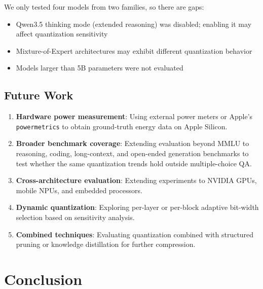 \documentclass[11pt,a4paper]{article}
\begin{document}
We only tested four models from two families, so there are gaps:

\begin{itemize}[leftmargin=*,nosep]
    \item Qwen3.5 thinking mode (extended reasoning) was disabled; enabling it may affect quantization sensitivity
    \item Mixture-of-Expert architectures may exhibit different quantization behavior
    \item Models larger than 5B parameters were not evaluated
\end{itemize}

\subsection{Future Work}

\begin{enumerate}[leftmargin=*,nosep]
    \item \textbf{Hardware power measurement}: Using external power meters or Apple's \texttt{powermetrics} to obtain ground-truth energy data on Apple Silicon.

    \item \textbf{Broader benchmark coverage}: Extending evaluation beyond MMLU to reasoning, coding, long-context, and open-ended generation benchmarks to test whether the same quantization trends hold outside multiple-choice QA.

    \item \textbf{Cross-architecture evaluation}: Extending experiments to NVIDIA GPUs, mobile NPUs, and embedded processors.

    \item \textbf{Dynamic quantization}: Exploring per-layer or per-block adaptive bit-width selection based on sensitivity analysis.

    \item \textbf{Combined techniques}: Evaluating quantization combined with structured pruning or knowledge distillation for further compression.
\end{enumerate}

\section{Conclusion}
\end{document}
